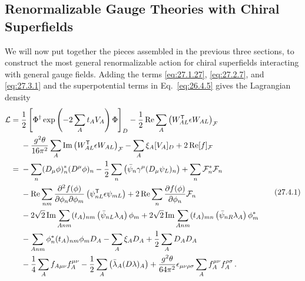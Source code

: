 
\subsection{Renormalizable Gauge Theories with Chiral Superfields}

We will now put together the pieces assembled in the previous three sections,
to construct the most general renormalizable action for chiral superfields
interacting with general gauge fields. Adding the terms
\eqref{eq:27.1.27}, \eqref{eq:27.2.7}, and \eqref{eq:27.3.1} and the
superpotential terms in Eq.~\eqref{eq:26.4.5} gives the Lagrangian density
\begin{equation}
  \begin{aligned}
  \mathcal{L}={}&
  \frac12\left[
    \Phi^\dagger
    \exp\left(-2\sum_A t_A V_A\right)\Phi
  \right]_D
  -\frac12\operatorname{Re}\sum_A
    \left(W_{AL}^{\mathsf T}\epsilon W_{AL}\right)_{\mathcal{F}}
  \\
  &-\frac{g^2\theta}{16\pi^2}\sum_A
    \operatorname{Im}
    \left(W_{AL}^{\mathsf T}\epsilon W_{AL}\right)_{\mathcal{F}}
  -\sum_A\xi_A[V_A]_D
  +2\operatorname{Re}[f]_{\mathcal{F}}
  \\
  ={}&
  -\sum_n(D_\mu\phi)_n^*(D^\mu\phi)_n
  -\frac12\sum_n
    \left(\bar\psi_n\gamma^\mu(D_\mu\psi_L)_n\right)
  +\sum_n\mathcal{F}_n^*\mathcal{F}_n
  \\
  &-\operatorname{Re}\sum_{nm}
    \frac{\partial^2f(\phi)}{\partial\phi_n\partial\phi_m}
    \left(\psi_{nL}^{\mathsf T}\epsilon\psi_{mL}\right)
  +2\operatorname{Re}\sum_n
    \frac{\partial f(\phi)}{\partial\phi_n}\mathcal{F}_n
  \\
  &-2\sqrt{2}\operatorname{Im}\sum_{Anm}
    (t_A)_{nm}\left(\bar\psi_{nL}\lambda_A\right)\phi_m
  +2\sqrt{2}\operatorname{Im}\sum_{Anm}
    (t_A)_{mn}\left(\bar\psi_{nR}\lambda_A\right)\phi_m^*
  \\
  &-\sum_{Anm}\phi_n^*(t_A)_{nm}\phi_mD_A
  -\sum_A\xi_AD_A
  +\frac12\sum_A D_AD_A
  \\
  &-\frac14\sum_A f_{A\mu\nu}f_A^{\mu\nu}
  -\frac12\sum_A\left(\bar\lambda_A(\sl{D}\lambda)_A\right)
  +\frac{g^2\theta}{64\pi^2}\epsilon_{\mu\nu\rho\sigma}
    \sum_Af_A^{\mu\nu}f_A^{\rho\sigma}\,.
  \end{aligned}
  \tag{27.4.1}\label{eq:27.4.1}
\end{equation}
